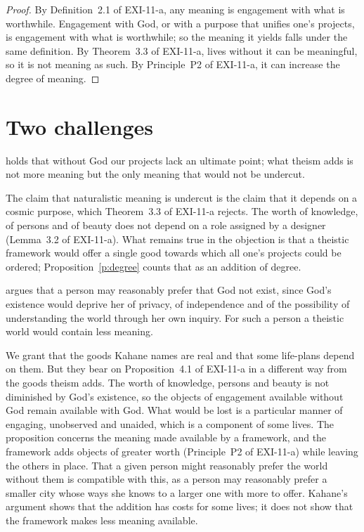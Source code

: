 \documentclass{situationist-preprint}
\begin{document}
\begin{proof}
By Definition~2.1 of EXI-11-a, any meaning is engagement with what is worthwhile. Engagement with God, or with a purpose that unifies one's projects, is engagement with what is worthwhile; so the meaning it yields falls under the same definition. By Theorem~3.3 of EXI-11-a, lives without it can be meaningful, so it is not meaning as such. By Principle~P2 of EXI-11-a, it can increase the degree of meaning.
\end{proof}

\section{Two challenges}

\begin{objection}
\citet{Cottingham2003} holds that without God our projects lack an ultimate point; what theism adds is not more meaning but the only meaning that would not be undercut.
\end{objection}

\begin{reply}
The claim that naturalistic meaning is undercut is the claim that it depends on a cosmic purpose, which Theorem~3.3 of EXI-11-a rejects. The worth of knowledge, of persons and of beauty does not depend on a role assigned by a designer (Lemma~3.2 of EXI-11-a). What remains true in the objection is that a theistic framework would offer a single good towards which all one's projects could be ordered; Proposition~\ref{p:degree} counts that as an addition of degree.
\end{reply}

\begin{objection}
\citet{Kahane2011} argues that a person may reasonably prefer that God not exist, since God's existence would deprive her of privacy, of independence and of the possibility of understanding the world through her own inquiry. For such a person a theistic world would contain less meaning.
\end{objection}

\begin{reply}
We grant that the goods Kahane names are real and that some life-plans depend on them. But they bear on Proposition~4.1 of EXI-11-a in a different way from the goods theism adds. The worth of knowledge, persons and beauty is not diminished by God's existence, so the objects of engagement available without God remain available with God. What would be lost is a particular manner of engaging, unobserved and unaided, which is a component of some lives. The proposition concerns the meaning made available by a framework, and the framework adds objects of greater worth (Principle~P2 of EXI-11-a) while leaving the others in place. That a given person might reasonably prefer the world without them is compatible with this, as a person may reasonably prefer a smaller city whose ways she knows to a larger one with more to offer. Kahane's argument shows that the addition has costs for some lives; it does not show that the framework makes less meaning available.
\end{reply}
\end{document}
